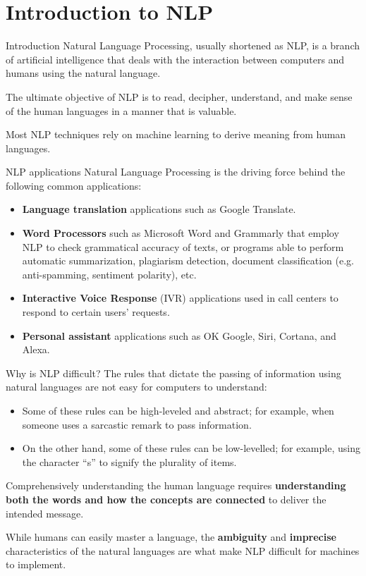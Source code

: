 \section{Introduction to NLP}

\begin{frame}[containsverbatim]{Introduction}
    Natural Language Processing, usually shortened as NLP, is a branch of artificial intelligence that deals with the interaction between computers and humans using the natural language.
    
    The ultimate objective of NLP is to read, decipher, understand, and make sense of the human languages in a manner that is valuable.
    
    Most NLP techniques rely on machine learning to derive meaning from human languages.
\end{frame}

\begin{frame}[containsverbatim]{NLP applications}
    Natural Language Processing is the driving force behind the following common applications:
    \begin{itemize}
        \item \textbf{Language translation} applications such as Google Translate.
        \item \textbf{Word Processors} such as Microsoft Word and Grammarly that employ NLP to check grammatical accuracy of texts, or programs able to perform automatic summarization, plagiarism detection, document classification (e.g. anti-spamming, sentiment polarity), etc.
        \item \textbf{Interactive Voice Response} (IVR) applications used in call centers to respond to certain users’ requests.
        \item \textbf{Personal assistant} applications such as OK Google, Siri, Cortana, and Alexa.
    \end{itemize}
\end{frame}

\begin{frame}[containsverbatim]{Why is NLP difficult?}
    The rules that dictate the passing of information using natural languages are not easy for computers to understand:
    \begin{itemize}
        \item Some of these rules can be high-leveled and abstract; for example, when someone uses a sarcastic remark to pass information.
        \item On the other hand, some of these rules can be low-levelled; for example, using the character “s” to signify the plurality of items.
    \end{itemize}
    
    Comprehensively understanding the human language requires \textbf{understanding both the words and how the concepts are connected} to deliver the intended message.
    
    While humans can easily master a language, the \textbf{ambiguity} and \textbf{imprecise} characteristics of the natural languages are what make NLP difficult for machines to implement.
\end{frame}


